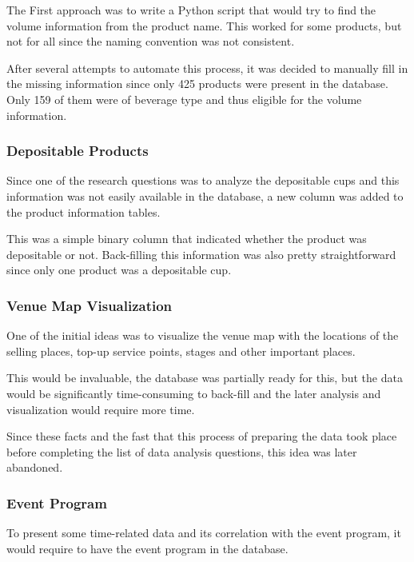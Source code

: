 The First approach was to write a Python script that would try to find the volume information from the product name.
This worked for some products, but not for all since the naming convention was not consistent.

After several attempts to automate this process, it was decided to manually fill in the missing information since only 425 products were present in the database.
Only 159 of them were of beverage type and thus eligible for the volume information.

\subsubsection{Depositable Products}
\label{subsubsec:data-methodology-local-database-modifications-depositable}
Since one of the research questions was to analyze the depositable cups and this information was not easily available in the database, a new column was added to the product information tables.

This was a simple binary column that indicated whether the product was depositable or not.
Back-filling this information was also pretty straightforward since only one product was a depositable cup.

\subsubsection{Venue Map Visualization}
\label{subsubsec:data-methodology-local-database-modifications-venue-map}
One of the initial ideas was to visualize the venue map with the locations of the selling places, top-up service points, stages and other important places.

This would be invaluable, the database was partially ready for this, but the data would be significantly time-consuming to back-fill and the later analysis and visualization would require more time.

Since these facts and the fast that this process of preparing the data took place before completing the list of data analysis questions, this idea was later abandoned.

\subsubsection{Event Program}
\label{subsubsec:data-methodology-local-database-modifications-program}
To present some time-related data and its correlation with the event program, it would require to have the event program in the database.

